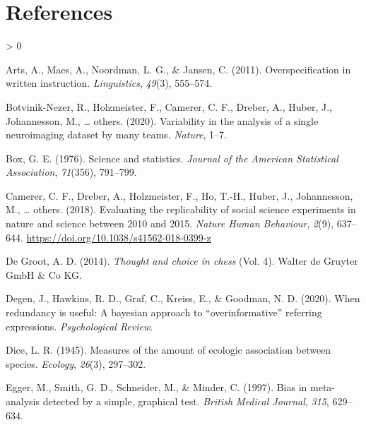 \documentclass[
  english,
  man,floatsintext]{apa6}
\newlength{\cslhangindent}
\newenvironment{CSLReferences}[2] %
 {%
  \setlength{\parindent}{0pt}
  \ifodd #1 \everypar{\setlength{\hangindent}{\cslhangindent}}\ignorespaces\fi
  \ifnum #2 > 0
  \setlength{\parskip}{#2\baselineskip}
  \fi
 }%
 {}
\begin{document}
\newpage

\hypertarget{references}{%
\section{References}\label{references}}

\begingroup
\setlength{\parindent}{-0.5in}
\setlength{\leftskip}{0.5in}

\hypertarget{refs}{}
\begin{CSLReferences}{1}{0}
\leavevmode\hypertarget{ref-arts2011overspecification}{}%
Arts, A., Maes, A., Noordman, L. G., \& Jansen, C. (2011). Overspecification in written instruction. \emph{Linguistics}, \emph{49}(3), 555--574.

\leavevmode\hypertarget{ref-botvinik2020variability}{}%
Botvinik-Nezer, R., Holzmeister, F., Camerer, C. F., Dreber, A., Huber, J., Johannesson, M., \ldots{} others. (2020). Variability in the analysis of a single neuroimaging dataset by many teams. \emph{Nature}, 1--7.

\leavevmode\hypertarget{ref-box1976science}{}%
Box, G. E. (1976). Science and statistics. \emph{Journal of the American Statistical Association}, \emph{71}(356), 791--799.

\leavevmode\hypertarget{ref-camerer2018evaluating}{}%
Camerer, C. F., Dreber, A., Holzmeister, F., Ho, T.-H., Huber, J., Johannesson, M., \ldots{} others. (2018). Evaluating the replicability of social science experiments in nature and science between 2010 and 2015. \emph{Nature Human Behaviour}, \emph{2}(9), 637--644. \url{https://doi.org/10.1038/s41562-018-0399-z}

\leavevmode\hypertarget{ref-de2014thought}{}%
De Groot, A. D. (2014). \emph{Thought and choice in chess} (Vol. 4). Walter de Gruyter GmbH \& Co KG.

\leavevmode\hypertarget{ref-degen2020redundancy}{}%
Degen, J., Hawkins, R. D., Graf, C., Kreiss, E., \& Goodman, N. D. (2020). When redundancy is useful: A bayesian approach to {``overinformative''} referring expressions. \emph{Psychological Review}.

\leavevmode\hypertarget{ref-dice1945}{}%
Dice, L. R. (1945). Measures of the amount of ecologic association between species. \emph{Ecology}, \emph{26}(3), 297--302.

\leavevmode\hypertarget{ref-egger1997}{}%
Egger, M., Smith, G. D., Schneider, M., \& Minder, C. (1997). Bias in meta-analysis detected by a simple, graphical test. \emph{British Medical Journal}, \emph{315}, 629--634.


\end{CSLReferences}
\end{document}
